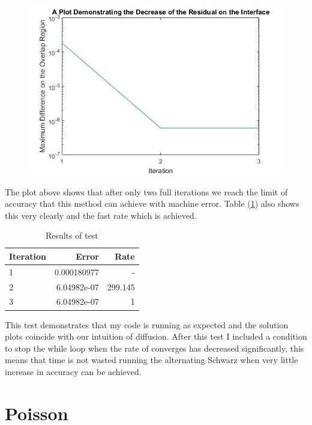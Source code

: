\documentclass[11pt,a4paper,notitlepage]{article}
\begin{document}
\begin{figure}[h] 
\includegraphics[width=.9\linewidth]{DiffRes1.jpg}
\caption{}
\label{diff.resplot}
\end{figure}

The plot above shows that after only two full iterations we reach the limit of accuracy that this method can achieve with machine error. Table (\ref{diff.table}) also shows this very clearly and the fast rate which is achieved.

\begin{table}[h]
  \begin{center}
    \begin{tabular}{|l|rr|}
	\hline
	Iteration & Error & Rate \\  
    \hline
    1 & 0.000180977	& - \\
    2 & 6.04982e-07 & 299.145 \\
    3 & 6.04982e-07 & 1\\
    \hline
    \end{tabular}
  \end{center}
  \vspace{-10pt}
  \caption{Results of test}
  \label{diff.table}
\end{table}
\newpage
This test demonstrates that my code is running as expected and the solution plots coincide with our intuition of diffusion. After this test I included a condition to stop the while loop when the rate of converges has decreased significantly, this means that time is not wasted running the alternating Schwarz when very little increase in accuracy can be achieved.


\section{Poisson}
\end{document}
